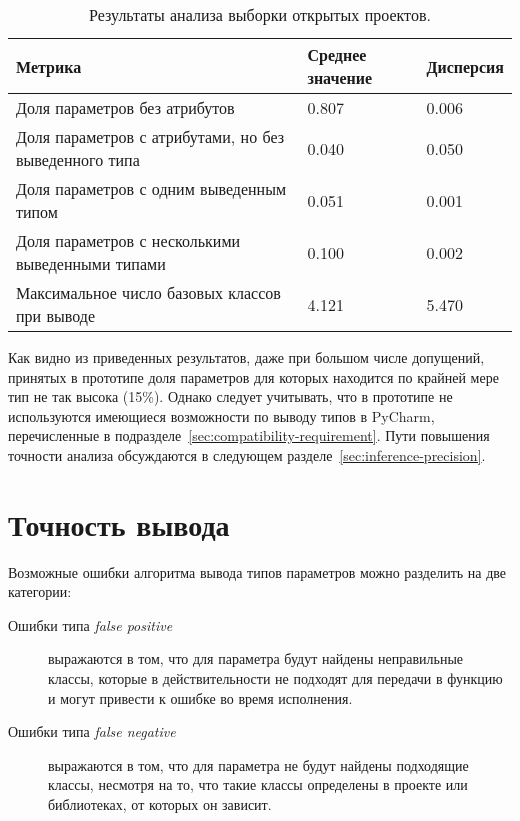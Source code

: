 \begin{table}[H]
  \scriptsize
  \caption{Результаты анализа выборки открытых проектов.}
  \label{tab:statistics-results-2}
  \begin{tabularx}{\textwidth}{ |X|X|X| }
    \hline
    Метрика & Среднее значение & Дисперсия \\ \hline
    Доля параметров без атрибутов & 0.807 & 0.006 \\ \hline
    Доля параметров с атрибутами, но без выведенного типа & 0.040 & 0.050 \\ \hline
    Доля параметров с одним выведенным типом & 0.051 & 0.001 \\ \hline
    Доля параметров с несколькими выведенными типами & 0.100 & 0.002 \\ \hline
    Максимальное число базовых классов при выводе & 4.121 & 5.470 \\ \hline
  \end{tabularx}
\end{table}

Как видно из приведенных результатов, даже при большом числе допущений,
принятых в прототипе доля параметров для которых находится по крайней мере тип
не так высока (15\%).  Однако следует учитывать, что в прототипе не используются
имеющиеся возможности по выводу типов в PyCharm, перечисленные в
подразделе~\ref{sec:compatibility-requirement}.  Пути повышения точности анализа
обсуждаются в следующем разделе~\ref{sec:inference-precision}.

\section{Точность вывода}
\label{sec:inference-precision-analysis}

Возможные ошибки алгоритма вывода типов параметров можно разделить на две категории:
\begin{description}
    \item[Ошибки типа \emph{false positive}] выражаются в том, что для параметра
      будут найдены неправильные классы, которые в
      действительности не подходят для передачи в функцию и могут привести к
      ошибке во время исполнения.

    \item[Ошибки типа \emph{false negative}] выражаются в том, что для параметра
      не будут найдены подходящие классы, несмотря на то, что такие классы
      определены в проекте или библиотеках, от которых он зависит.

\end{description}

